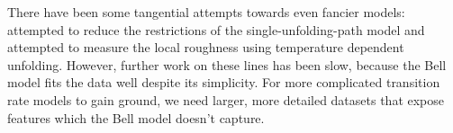 There have been some tangential attempts towards even fancier models:
\citet{dudko03} attempted to reduce the restrictions of the
single-unfolding-path model and \citet{hyeon03} attempted to measure
the local roughness using temperature dependent unfolding.  However,
further work on these lines has been slow, because the Bell model fits
the data well despite its simplicity.  For more complicated transition
rate models to gain ground, we need larger, more detailed datasets
that expose features which the Bell model doesn't capture.
